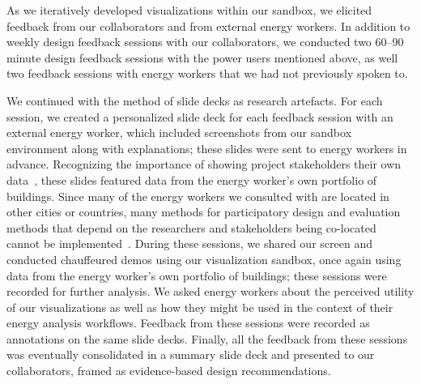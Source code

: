 \documentclass[journal]{vgtc}                %
\newcommand{\bstart}[1]{\vspace{1mm} \noindent{\textbf{#1:}}}
\newcommand{\tm}[1]{\textcolor{red}{#1}}
\begin{document}
\bstart{Eliciting feedback from energy workers} As we iteratively developed visualizations within our sandbox, we elicited feedback from our collaborators and from external energy workers.
In addition to weekly design feedback sessions with our collaborators, we conducted two 60--90 minute design feedback sessions with the power users mentioned above, as well two feedback sessions with energy workers that we had not previously spoken to.

We continued with the method of slide decks as research artefacts. For each session, we created a personalized slide deck for each feedback session with an external energy worker, which included screenshots from our sandbox environment along with explanations; these slides were sent to energy workers in advance.
Recognizing the importance of showing project stakeholders their own data~\cite{Lloyd2011}, these slides featured data from the energy worker's own portfolio of buildings.
Since many of the energy workers we consulted with are located in other cities or countries, many methods for participatory design and evaluation methods that depend on the researchers and stakeholders being co-located~\cite{Goodwin2013,McKenna2014} cannot be implemented~\cite{Brehmer2014a}.
During these sessions, we shared our screen and conducted chauffeured demos using our visualization sandbox, once again using data from the energy worker's own portfolio of buildings; these sessions were recorded for further analysis.
We asked energy workers about the perceived utility of our visualizations as well as how they might be used in the context of their energy analysis workflows.
Feedback from these sessions were recorded as annotations on the same slide decks.
Finally, all the feedback from these sessions was eventually consolidated in a summary slide deck and presented to our collaborators, framed as evidence-based design recommendations.
\end{document}
